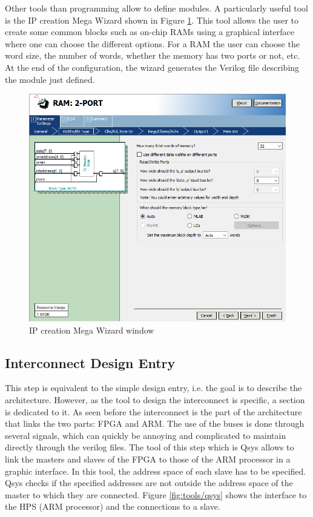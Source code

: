 Other tools than programming allow to define modules. A particularly useful tool is the IP creation 
Mega Wizard shown in Figure \ref{fig:tools/megawizard}. This tool allows the user to create some common 
blocks such as on-chip RAMs using a graphical interface where one can choose the different options. 
For a RAM the user can choose the word size, the number of words, whether the memory has 
two ports or not, etc. At the end of the configuration, the wizard generates the Verilog file 
describing the module just defined.

\begin{figure}[H]
    \centering
    \includegraphics[scale=0.6]{Chapter2-FPGA_Flow/res/megawizard.PNG}
    \caption{IP creation Mega Wizard window}
    \label{fig:tools/megawizard}
\end{figure}

\subsection{Interconnect Design Entry}

This step is equivalent to the simple design entry, i.e. the goal is to describe the architecture. 
However, as the tool to design the interconnect is specific, a section is dedicated to it. As seen 
before the interconnect is the part of the architecture that links the two parts: FPGA and ARM. The 
use of the buses is done through several signals, which can quickly be annoying and complicated to 
maintain directly through the verilog files. The tool of this step which is Qsys allows to link 
the masters and slaves of the FPGA to those of the ARM processor in a graphic interface. In this 
tool, the address space of each slave has to be specified. Qsys checks if the specified 
addresses are not outside the address space of the master to which they are connected. Figure \ref{fig:tools/qsys} 
shows the interface to the HPS (ARM processor) and the connections to a slave.


